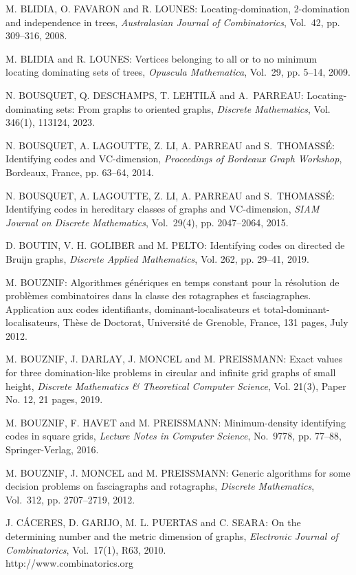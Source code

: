 \begin{thebibliography}{999}
M. BLIDIA, O. FAVARON and R. LOUNES: Locating-domination, 2-domination and
independence in trees, {\it Australasian Journal of Combinatorics}, Vol.~42, pp.
309--316, 2008. 

M. BLIDIA and R. LOUNES: Vertices belonging to all or to no minimum locating dominating sets of trees, {\it Opuscula Mathematica}, Vol.~29, pp. 5--14, 2009.

N. BOUSQUET, Q. DESCHAMPS, T. LEHTIL\"A and A.~PARREAU: Locating-dominating sets: {F}rom graphs to oriented graphs, {\it Discrete Mathematics}, Vol. 346(1), 113124, 2023. 

N. BOUSQUET, A. LAGOUTTE, Z. LI, A. PARREAU and S.~THO\-MASS\'E: Identifying codes and VC-dimension, {\it Proceedings of Bordeaux Graph Workshop}, Bordeaux, France, pp. 63--64, 2014.

N. BOUSQUET, A. LAGOUTTE, Z. LI, A. PARREAU and S.~THO\-MASS\'E: Identifying codes in hereditary classes of graphs and VC-dimension, {\it SIAM Journal on Discrete Mathematics}, Vol.~29(4), pp. 2047--2064, 2015.

D. BOUTIN, V. H. GOLIBER and M. PELTO: Identifying codes on directed de Bruijn graphs, {\it Discrete Applied Mathematics}, Vol. 262, pp. 29--41, 2019.

M. BOUZNIF: Algorithmes g\'en\'eriques en temps constant pour la r\'eso\-lution de probl\`emes combinatoires dans la classe des rotagraphes et fasciagraphes. Application aux codes identifiants, dominant-localisateurs et total-dominant-localisateurs, Th\`ese de Doctorat, Universit\'e de Grenoble, France, 131 pages, July 2012.

M. BOUZNIF, J. DARLAY, J. MONCEL and M. PREISSMANN: Exact values for three domination-like problems in circular and infinite grid graphs of small height, {\it Discrete Mathematics \& Theoretical Computer Science}, Vol. 21(3), Paper No. 12, 21 pages, 2019.

M. BOUZNIF, F. HAVET and M. PREISSMANN: Minimum-density identifying codes in square grids, {\it Lecture Notes in Computer Science}, No.~9778, pp. 77--88, Springer-Verlag, 2016.

M. BOUZNIF, J. MONCEL and M. PREISSMANN: Generic algorithms for some decision problems on fasciagraphs and rotagraphs, {\it Discrete Mathematics}, Vol.~312, pp. 2707--2719, 2012.

J. C\'ACERES, D. GARIJO, M. L. PUERTAS and C. SEARA: On the determining number and the metric dimension of graphs, {\it Electronic Journal of Combinatorics}, Vol.~17(1), R63, 2010.\\
http://www.combinatorics.org


\end{thebibliography}
